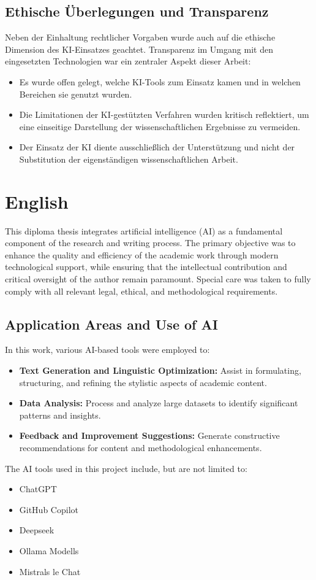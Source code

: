 \subsection*{Ethische Überlegungen und Transparenz}
Neben der Einhaltung rechtlicher Vorgaben wurde auch auf die ethische Dimension des KI-Einsatzes geachtet. Transparenz im Umgang mit den eingesetzten Technologien war ein zentraler Aspekt dieser Arbeit:
\begin{itemize}
    \item Es wurde offen gelegt, welche KI-Tools zum Einsatz kamen und in welchen Bereichen sie genutzt wurden.
    \item Die Limitationen der KI-gestützten Verfahren wurden kritisch reflektiert, um eine einseitige Darstellung der wissenschaftlichen Ergebnisse zu vermeiden.
    \item Der Einsatz der KI diente ausschließlich der Unterstützung und nicht der Substitution der eigenständigen wissenschaftlichen Arbeit.
\end{itemize}

\section*{English}
This diploma thesis integrates artificial intelligence (AI) as a fundamental component of the research and writing process. The primary objective was to enhance the quality and efficiency of the academic work through modern technological support, while ensuring that the intellectual contribution and critical oversight of the author remain paramount. Special care was taken to fully comply with all relevant legal, ethical, and methodological requirements.

\subsection*{Application Areas and Use of AI}
In this work, various AI-based tools were employed to:
\begin{itemize}
    \item \textbf{Text Generation and Linguistic Optimization:} Assist in formulating, structuring, and refining the stylistic aspects of academic content.
    \item \textbf{Data Analysis:} Process and analyze large datasets to identify significant patterns and insights.
    \item \textbf{Feedback and Improvement Suggestions:} Generate constructive recommendations for content and methodological enhancements.
\end{itemize}
The AI tools used in this project include, but are not limited to:
\begin{itemize}
    \item ChatGPT
    \item GitHub Copilot
    \item Deepseek
    \item Ollama Modells
    \item Mistrals le Chat
\end{itemize}

